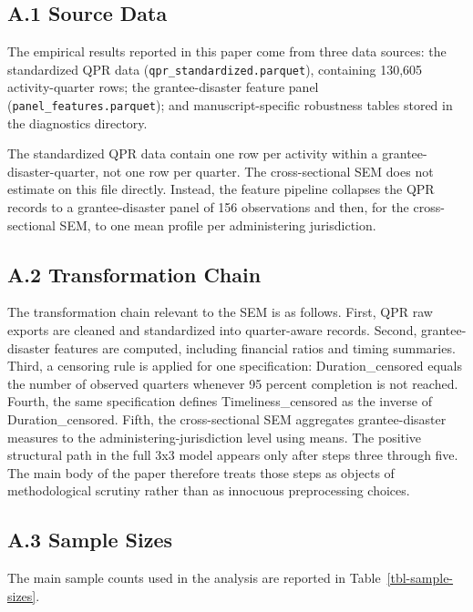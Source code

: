 \documentclass[
  number]{elsarticle}
\begin{document}
\subsection{A.1 Source Data}\label{a.1-source-data}

The empirical results reported in this paper come from three data
sources: the standardized QPR data (\texttt{qpr\_standardized.parquet}),
containing 130,605 activity-quarter rows; the grantee-disaster feature
panel (\texttt{panel\_features.parquet}); and manuscript-specific
robustness tables stored in the diagnostics directory.

The standardized QPR data contain one row per activity within a
grantee-disaster-quarter, not one row per quarter. The cross-sectional
SEM does not estimate on this file directly. Instead, the feature
pipeline collapses the QPR records to a grantee-disaster panel of 156
observations and then, for the cross-sectional SEM, to one mean profile
per administering jurisdiction.

\subsection{A.2 Transformation Chain}\label{a.2-transformation-chain}

The transformation chain relevant to the SEM is as follows. First, QPR
raw exports are cleaned and standardized into quarter-aware records.
Second, grantee-disaster features are computed, including financial
ratios and timing summaries. Third, a censoring rule is applied for one
specification: Duration\_censored equals the number of observed quarters
whenever 95 percent completion is not reached. Fourth, the same
specification defines Timeliness\_censored as the inverse of
Duration\_censored. Fifth, the cross-sectional SEM aggregates
grantee-disaster measures to the administering-jurisdiction level using
means. The positive structural path in the full 3x3 model appears only
after steps three through five. The main body of the paper therefore
treats those steps as objects of methodological scrutiny rather than as
innocuous preprocessing choices.

\subsection{A.3 Sample Sizes}\label{a.3-sample-sizes}

The main sample counts used in the analysis are reported in
Table~\ref{tbl-sample-sizes}.
\end{document}
